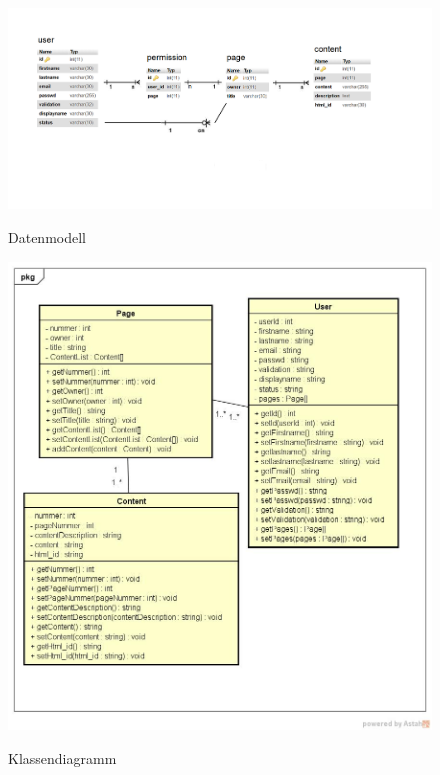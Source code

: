 \documentclass[10.5pt]{scrarticle}
\begin{document}
\begin{figure}[h!]
\caption{Datenmodell}
\includegraphics[width=\textwidth]{DatenmodellEPortfolio}
\label{fig:datenmodell}
\end{figure}

\begin{figure}[h!]
\caption{Klassendiagramm}
\includegraphics[scale=0.35]{ClassDiagram}
\label{fig:classdiagram}
\end{figure}
\end{document}
